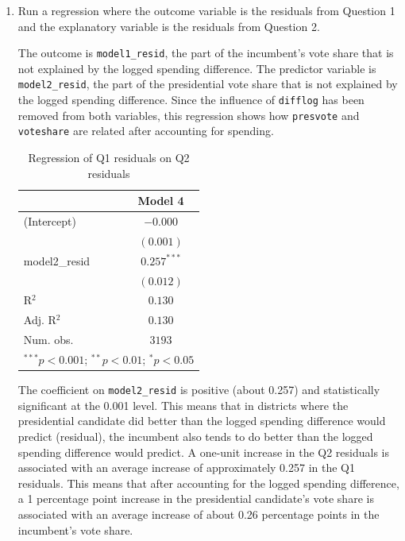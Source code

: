 \documentclass[12pt,letterpaper]{article}
\begin{document}
	\begin{enumerate}
		\item Run a regression where the outcome variable is the residuals from Question 1 and the explanatory variable is the residuals from Question 2.	
		
		\noindent The outcome is \texttt{model1\_resid}, the part of the incumbent's vote share that is not explained by the logged spending difference. The predictor variable is \texttt{model2\_resid}, the part of the presidential vote share that is not explained by the logged spending difference. Since the influence of \texttt{difflog} has been removed from both variables, this regression shows how \texttt{presvote} and \texttt{voteshare} are related after accounting for spending. 
		
		
		
		\begin{table} [H]
			\begin{center}
				\begin{tabular}{l c}
					\hline
					& Model 4 \\
					\hline
					(Intercept)   & $-0.000$      \\
					& $(0.001)$     \\
					model2\_resid & $0.257^{***}$ \\
					& $(0.012)$     \\
					\hline
					R$^2$         & $0.130$       \\
					Adj. R$^2$    & $0.130$       \\
					Num. obs.     & $3193$        \\
					\hline
					\multicolumn{2}{l}{\scriptsize{$^{***}p<0.001$; $^{**}p<0.01$; $^{*}p<0.05$}}
				\end{tabular}
				\caption{Regression of Q1 residuals on Q2 residuals}
				\label{table:model4}
			\end{center}
		\end{table}
		
		\noindent The coefficient on \texttt{model2\_resid} is positive (about 0.257) and statistically significant at the 0.001 level. This means that in districts where the presidential candidate did better than the logged spending difference would predict (residual), the incumbent also tends to do better than the logged spending difference would predict. A one-unit increase in the Q2 residuals is associated with an average increase of approximately 0.257 in the Q1 residuals. This means that after accounting for the logged spending difference, a 1 percentage point increase in the presidential candidate's vote share is associated with an average increase of about 0.26 percentage points in the incumbent's vote share.
		

\end{enumerate}
\end{document}
